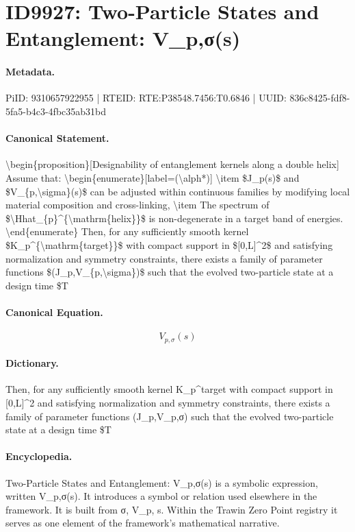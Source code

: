\section*{ID9927: Two-Particle States and Entanglement: V\_p,σ(s)}
\paragraph{Metadata.}
PiID: 9310657922955 | RTEID: RTE:P38548.7456:T0.6846 | UUID: 836c8425-fdf8-5fa5-b4c3-4fbc35ab31bd

\paragraph{Canonical Statement.}
\textbackslash{}begin\{proposition\}[Designability of entanglement kernels along a double helix] Assume that: \textbackslash{}begin\{enumerate\}[label=(\textbackslash{}alph*)] \textbackslash{}item \$J\_p(s)\$ and \$V\_\{p,\textbackslash{}sigma\}(s)\$ can be adjusted within continuous families by modifying local material composition and cross-linking, \textbackslash{}item The spectrum of \$\textbackslash{}Hhat\_\{p\}\textasciicircum{}\{\textbackslash{}mathrm\{helix\}\}\$ is non-degenerate in a target band of energies. \textbackslash{}end\{enumerate\} Then, for any sufficiently smooth kernel \$K\_p\textasciicircum{}\{\textbackslash{}mathrm\{target\}\}\$ with compact support in \$[0,L]\textasciicircum{}2\$ and satisfying normalization and symmetry constraints, there exists a family of parameter functions \$(J\_p,V\_\{p,\textbackslash{}sigma\})\$ such that the evolved two-particle state at a design time \$T

\paragraph{Canonical Equation.}
\[
V_{p,\sigma}(s)
\]

\paragraph{Dictionary.}
Then, for any sufficiently smooth kernel K\_p\textasciicircum{}target with compact support in [0,L]\textasciicircum{}2 and satisfying normalization and symmetry constraints, there exists a family of parameter functions (J\_p,V\_p,σ) such that the evolved two-particle state at a design time \$T

\paragraph{Encyclopedia.}
Two-Particle States and Entanglement: V\_p,σ(s) is a symbolic expression, written V\_p,σ(s). It introduces a symbol or relation used elsewhere in the framework. It is built from σ, V\_p, s. Within the Trawin Zero Point registry it serves as one element of the framework's mathematical narrative.
